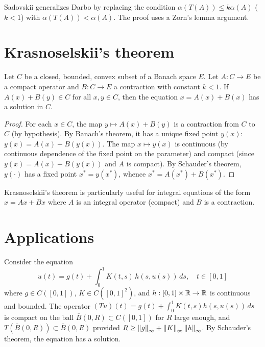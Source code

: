 \begin{remark}
Sadovskii generalizes Darbo by replacing the condition
$\alpha(T(A)) \leq k\alpha(A)$ ($k < 1$) with $\alpha(T(A)) < \alpha(A)$. The
proof uses a Zorn's lemma argument.
\end{remark}

\section{Krasnoselskii's theorem}

\begin{theorem}[Krasnoselskii, 1958]\label{thm:krasnoselskii}
Let $C$ be a closed, bounded, convex subset of a Banach space $E$. Let
$A : C \to E$ be a compact operator and $B : C \to E$ a contraction with
constant $k < 1$. If $A(x) + B(y) \in C$ for all $x, y \in C$, then the
equation $x = A(x) + B(x)$ has a solution in $C$.
\end{theorem}

\begin{proof}
For each $x \in C$, the map $y \mapsto A(x) + B(y)$ is a contraction from $C$
to $C$ (by hypothesis). By Banach's theorem, it has a unique fixed point $y(x)$:
$y(x) = A(x) + B(y(x))$. The map $x \mapsto y(x)$ is continuous (by continuous
dependence of the fixed point on the parameter) and compact (since
$y(x) = A(x) + B(y(x))$ and $A$ is compact). By Schauder's theorem, $y(\cdot)$
has a fixed point $x^* = y(x^*)$, whence $x^* = A(x^*) + B(x^*)$.
\end{proof}

\begin{remark}
Krasnoselskii's theorem is particularly useful for integral equations of the
form $x = Ax + Bx$ where $A$ is an integral operator (compact) and $B$ is a
contraction.
\end{remark}

\section{Applications}

\begin{example}
Consider the equation
\[
    u(t) = g(t) + \int_0^1 K(t,s) \, h(s, u(s)) \, ds, \quad t \in [0,1]
\]
where $g \in C([0,1])$, $K \in C([0,1]^2)$, and $h : [0,1] \times \mathbb{R} \to \mathbb{R}$ is
continuous and bounded. The operator
$(Tu)(t) = g(t) + \int_0^1 K(t,s) h(s, u(s)) \, ds$ is compact on the ball
$\overline{B}(0, R) \subset C([0,1])$ for $R$ large enough, and
$T(\overline{B}(0,R)) \subset \overline{B}(0,R)$ provided
$R \geq \left\| g \right\|_\infty + \left\| K \right\|_\infty \left\| h \right\|_\infty$. By Schauder's
theorem, the equation has a solution.
\end{example}

